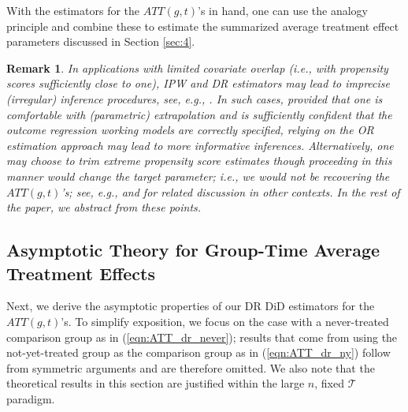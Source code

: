 \documentclass[11pt]{article}%
\theoremstyle{plain}
\newtheorem{remark}{Remark}
\numberwithin{sassumption}{section}
\numberwithin{equation}{section}
\begin{document}
With the estimators for the $ATT\left(  g,t\right)  $'s in hand, one can use
the analogy principle and combine these to estimate the summarized average
treatment effect parameters discussed in Section \ref{sec:4}.

\begin{remark}
In applications with limited covariate overlap (i.e., with propensity scores
sufficiently close to one), IPW and DR estimators may lead to imprecise
(irregular) inference procedures, see, e.g., \cite{Khan2010}. In such cases,
provided that one is comfortable with (parametric) extrapolation and is
sufficiently confident that the outcome regression working models are
correctly specified, relying on the OR estimation approach may lead to more
informative inferences. Alternatively, one may choose to trim extreme
propensity score estimates though proceeding in this manner would change the
target parameter; i.e., we would not be recovering the $ATT\left(  g,t\right)
$'s; see, e.g., \cite{Crump2009} and \cite{Yang2018} for related discussion in
other contexts. In the rest of the paper, we abstract from these points.
\end{remark}

\subsection{Asymptotic Theory for Group-Time Average Treatment
Effects\label{sec:asy-agg}}

Next, we derive the asymptotic properties of our DR DiD estimators for the
$ATT\left(  g,t\right)  $'s. To simplify exposition, we focus on the case with
a never-treated comparison group as in (\ref{eqn:ATT_dr_never}); results that
come from using the not-yet-treated group as the comparison group as in
(\ref{eqn:ATT_dr_ny}) follow from symmetric arguments and are therefore omitted. We also note that the theoretical results in this section are justified within the large $n$, fixed $\mathcal{T}$ paradigm.
\end{document}

